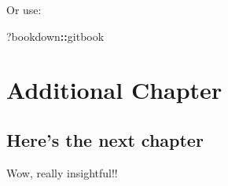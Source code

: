 \documentclass[
]{book}
\newenvironment{Shaded}{\begin{snugshade}}{\end{snugshade}}
\newcommand{\NormalTok}[1]{#1}
\newcommand{\SpecialCharTok}[1]{\textcolor[rgb]{0.81,0.36,0.00}{\textbf{#1}}}
\theoremstyle{definition}
\theoremstyle{definition}
\theoremstyle{definition}
\theoremstyle{definition}
\theoremstyle{remark}
\begin{document}
Or use:

\begin{Shaded}
\begin{Highlighting}[]
\NormalTok{?bookdown}\SpecialCharTok{::}\NormalTok{gitbook}
\end{Highlighting}
\end{Shaded}

\hypertarget{additional-chapter}{%
\chapter{Additional Chapter}\label{additional-chapter}}

\hypertarget{heres-the-next-chapter}{%
\section{Here's the next chapter}\label{heres-the-next-chapter}}

Wow, really insightful!!

  
\end{document}
